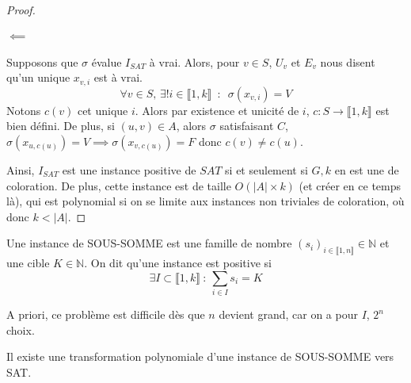 \begin{proof}
	\paragraph{$\boxed{\impliedby } $} Supposons que $\sigma$ évalue $I_{SAT}$ à vrai.
	Alors, pour $v \in S$, $U_v$ et $E_v$ nous disent qu'un unique $x_{v,i}$ est à vrai. 
	$$\forall v \in S, \, \exists! i \in  \llbracket1, k \rrbracket \enspace : \enspace \sigma(x_{v,i}) = V$$
	Notons $c(v)$ cet unique $i$. Alors par existence et unicité de $i$, $c : S \rightarrow \llbracket1, k \rrbracket $ est bien défini. De plus, si $(u,v) \in A$, alors $\sigma$ satisfaisant $C$, $\sigma\left(x_{u,c(u)}\right) = V \implies \sigma \left(x_{v, c(u)}\right) = F$ donc $c(v) \neq c(u)$.
	
	Ainsi, $I_{SAT}$ est une instance positive de $SAT$ si et seulement si $G, k$ en est une de coloration. De plus, cette instance est de taille $O(|A| \times k)$ (et créer en ce temps là), qui est polynomial si on se limite aux instances non triviales de coloration, où donc $k < |A|$.

	

\end{proof}

	
\begin{definition}
	Une instance de SOUS-SOMME est une famille de nombre $\left(s_{i}\right)_{i \in  \llbracket1, n \rrbracket} \in \mathbb N$ et une cible $K \in \mathbb N$. On dit qu'une instance est positive si $$\exists I \subset   \llbracket1, k \rrbracket \: : \: \sum\limits_{i \in I} s_i = K$$
\end{definition}

\begin{rem}
	A priori, ce problème est difficile dès que $n$ devient grand, car on a pour $I$, $2^n$ choix.
\end{rem}

\begin{theorem}
	Il existe une transformation polynomiale d'une instance de SOUS-SOMME vers SAT.
\end{theorem}

